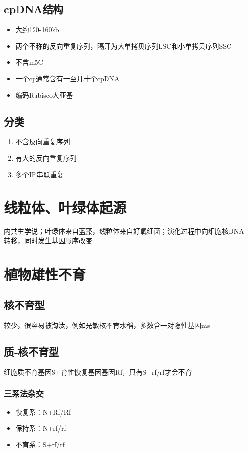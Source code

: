 \documentclass[a4paper, 12pt]{report}
\begin{document}
\subsection{cpDNA结构}
\begin{itemize}
    \item 大约120-160kb
    \item 两个不称的反向重复序列，隔开为大单拷贝序列LSC和小单拷贝序列SSC
    \item 不含m5C
    \item 一个cp通常含有一至几十个cpDNA
    \item 编码Rubisco大亚基
\end{itemize}
\subsection{分类}
\begin{enumerate}
    \item 不含反向重复序列
    \item 有大的反向重复序列
    \item 多个IR串联重复
\end{enumerate}
\section{线粒体、叶绿体起源}
内共生学说；叶绿体来自蓝藻，线粒体来自好氧细菌；演化过程中向细胞核DNA转移，同时发生基因顺序改变
\section{植物雄性不育}
\subsection{核不育型}
较少，很容易被淘汰，例如光敏核不育水稻，多数含一对隐性基因ms
\subsection{质-核不育型}
细胞质不育基因S+育性恢复基因基因Rf，只有S+rf/rf才会不育
\subsubsection{三系法杂交}
\begin{itemize}
    \item 恢复系：N+Rf/Rf
    \item 保持系：N+rf/rf
    \item 不育系：S+rf/rf
\end{itemize}
\end{document}
